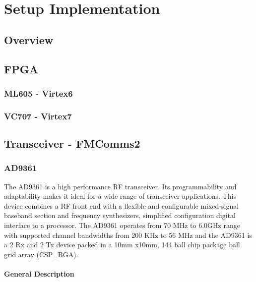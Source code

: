 \chapter{Setup Implementation}

\section{Overview}

\section{FPGA}

\subsection{ML605 - Virtex6}
\subsection{VC707 - Virtex7}

\section{Transceiver - FMComms2}
\subsection{AD9361}
\label{sec:ad9361}

The AD9361 is a high performance RF transceiver. Its programmability and adaptability makes it ideal for a wide range of transceiver applications. This device combines a RF front end with a flexible and configurable mixed-signal baseband section and frequency synthesizers, simplified configuration digital interface to a processor.
The AD9361 operates from 70 MHz to 6.0GHz range with supported channel bandwidths from 200 KHz to 56 MHz and the AD9361 is a 2 Rx and 2 Tx device packed in a 10mm x10mm, 144 ball chip package ball grid array (CSP\_BGA).

\subsubsection{General Description}


